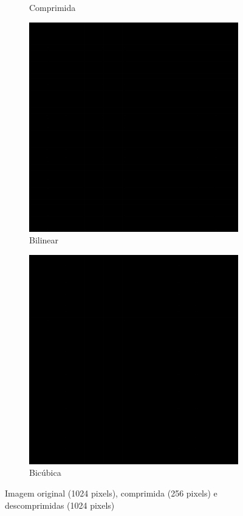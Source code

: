 \documentclass{article}
\begin{document}
\begin{figure}[ht]
\begin{subfigure}{0.23\textwidth}
    \caption{Comprimida}
  \end{subfigure}%
  \hfill
  \begin{subfigure}{0.23\textwidth}
    \centering
    \includegraphics[width=\textwidth]{pb/decompressed-bilinear.png}
    \caption{Bilinear}
  \end{subfigure}%
  \hfill
  \begin{subfigure}{0.23\textwidth}
    \centering
    \includegraphics[width=\textwidth]{pb/decompressed-bicubica.png}
    \caption{Bicúbica}
  \end{subfigure}
  \caption{Imagem original (1024 pixels), comprimida (256 pixels) e descomprimidas (1024 pixels)}
\end{figure}
\end{document}
